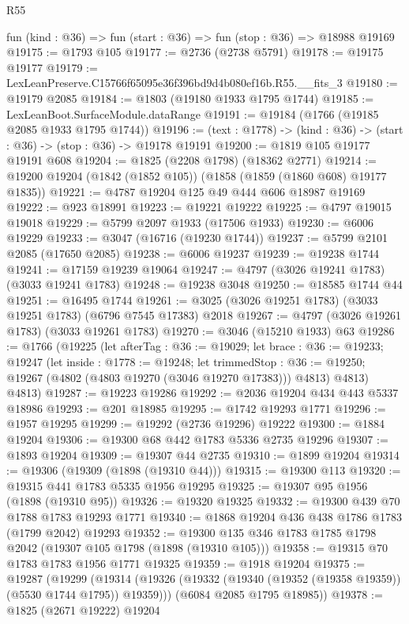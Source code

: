 \begin{lexlean}{R55}
\begin{coremodule}
  fun (kind : @36) => fun (start : @36) => fun (stop : @36) => @18988 @19169
@19175 := @1793 @105
@19177 := @2736 (@2738 @5791)
@19178 := @19175 @19177
@19179 := LexLeanPreserve.C15766f65095e36f396bd9d4b080ef16b.R55.__fits_3
@19180 := @19179 @2085
@19184 := @1803 (@19180 @1933 @1795 @1744)
@19185 := LexLeanBoot.SurfaceModule.dataRange
@19191 := @19184 (@1766 (@19185 @2085 @1933 @1795 @1744))
@19196 := (text : @1778) -> (kind : @36) -> (start : @36) -> (stop : @36) -> @19178 @19191
@19200 := @1819 @105 @19177 @19191 @608
@19204 := @1825 (@2208 @1798) (@18362 @2771)
@19214 := @19200 @19204 (@1842 (@1852 @105)) (@1858 (@1859 (@1860 @608) @19177 @1835))
@19221 := @4787 @19204 @125 @49 @444 @606 @18987 @19169
@19222 := @923 @18991
@19223 := @19221 @19222
@19225 := @4797 @19015 @19018
@19229 := @5799 @2097 @1933 (@17506 @1933)
@19230 := @6006 @19229
@19233 := @3047 (@16716 (@19230 @1744))
@19237 := @5799 @2101 @2085 (@17650 @2085)
@19238 := @6006 @19237
@19239 := @19238 @1744
@19241 := @17159 @19239 @19064
@19247 := @4797 (@3026 @19241 @1783) (@3033 @19241 @1783)
@19248 := @19238 @3048
@19250 := @18585 @1744 @44
@19251 := @16495 @1744
@19261 := @3025 (@3026 @19251 @1783) (@3033 @19251 @1783) (@6796 @7545 @17383) @2018
@19267 := @4797 (@3026 @19261 @1783) (@3033 @19261 @1783)
@19270 := @3046 (@15210 @1933) @63
@19286 := @1766
    (@19225
      (let afterTag : @36 := @19029;
      let brace : @36 := @19233;
      @19247
        (let inside : @1778 := @19248;
        let trimmedStop : @36 := @19250; @19267 (@4802 (@4803 @19270 (@3046 @19270 @17383))) @4813)
        @4813)
      @4813)
@19287 := @19223 @19286
@19292 := @2036 @19204 @434 @443 @5337 @18986
@19293 := @201 @18985
@19295 := @1742 @19293 @1771
@19296 := @1957 @19295
@19299 := @19292 (@2736 @19296) @19222
@19300 := @1884 @19204
@19306 := @19300 @68 @442 @1783 @5336 @2735 @19296
@19307 := @1893 @19204
@19309 := @19307 @44 @2735
@19310 := @1899 @19204
@19314 := @19306 (@19309 (@1898 (@19310 @44)))
@19315 := @19300 @113
@19320 := @19315 @441 @1783 @5335 @1956 @19295
@19325 := @19307 @95 @1956 (@1898 (@19310 @95))
@19326 := @19320 @19325
@19332 := @19300 @439 @70 @1788 @1783 @19293 @1771
@19340 := @1868 @19204 @436 @438 @1786 @1783 (@1799 @2042) @19293
@19352 := @19300 @135 @346 @1783 @1785 @1798 @2042 (@19307 @105 @1798 (@1898 (@19310 @105)))
@19358 := @19315 @70 @1783 @1783 @1956 @1771 @19325
@19359 := @1918 @19204
@19375 := @19287
    (@19299
      (@19314 (@19326 (@19332 (@19340 (@19352 (@19358 @19359)) (@5530 @1744 @1795)) @19359)))
      (@6084 @2085 @1795 @18985))
@19378 := @1825 (@2671 @19222) @19204

\end{coremodule}
\end{lexlean}
